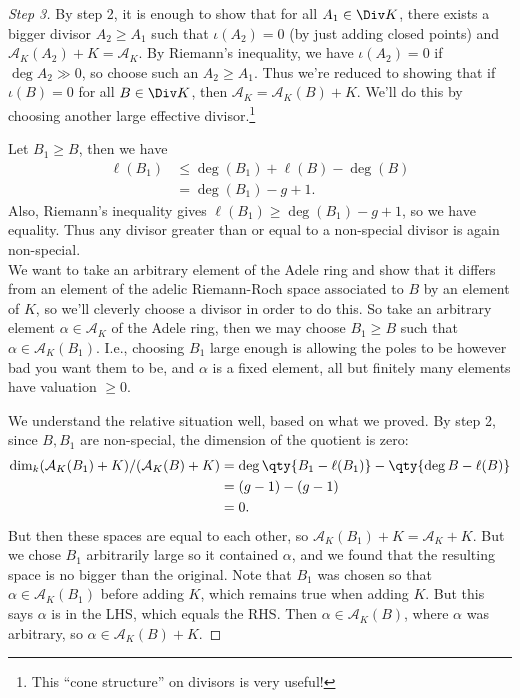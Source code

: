 \begin{proof}[Step 3]

By step 2, it is enough to show that for all \(A_1 \in \Div K\), there
exists a bigger divisor \(A_2 \geq A_1\) such that \(\iota(A_2) = 0\)
(by just adding closed points) and
\(\mathcal{A}_K(A_2) + K = \mathcal{A}_K\). By Riemann's inequality, we
have \(\iota(A_2) =0\) if \(\deg A_2 \gg 0\), so choose such an
\(A_2 \geq A_1\). Thus we're reduced to showing that if \(\iota(B) = 0\)
for all \(B\in \Div K\), then \(\mathcal{A}_K = \mathcal{A}_K(B) + K\).
We'll do this by choosing another large effective divisor.\footnote{This
  ``cone structure'' on divisors is very useful!}

Let \(B_1 \geq B\), then we have
\begin{align*}  
\ell(B_1) 
&\leq \deg(B_1) + \ell(B) - \deg(B) \\
&= \deg(B_1) - g + 1
.\end{align*} Also, Riemann's inequality gives
\(\ell(B_1) \geq \deg(B_1) - g + 1\), so we have equality. Thus any
divisor greater than or equal to a non-special divisor is again
non-special.\\

We want to take an arbitrary element of the Adele ring and show that it
differs from an element of the adelic Riemann-Roch space associated to
\(B\) by an element of \(K\), so we'll cleverly choose a divisor in
order to do this. So take an arbitrary element
\(\alpha\in \mathcal{A}_K\) of the Adele ring, then we may choose
\(B_1 \geq B\) such that \(\alpha\in \mathcal{A}_K(B_1)\). I.e.,
choosing \(B_1\) large enough is allowing the poles to be however bad
you want them to be, and \(\alpha\) is a fixed element, all but finitely
many elements have valuation \(\geq 0\).

We understand the relative situation well, based on what we proved. By
step 2, since \(B, B_1\) are non-special, the dimension of the quotient
is zero:
\begin{align*}  
\dim_k(\mathcal{A}_K(B_1) + K) / (\mathcal{A}_K(B) + K) 
&= \deg \qty{B_1 - \ell(B_1)} - \qty{\deg B - \ell(B) } \\
&= (g-1) - (g-1) \\
&= 0
.\end{align*} But then these spaces are equal to each other, so
\(\mathcal{A}_K(B_1) + K = \mathcal{A}_K + K\). But we chose \(B_1\)
arbitrarily large so it contained \(\alpha\), and we found that the
resulting space is no bigger than the original. Note that \(B_1\) was
chosen so that \(\alpha\in \mathcal{A}_K(B_1)\) before adding \(K\),
which remains true when adding \(K\). But this says \(\alpha\) is in the
LHS, which equals the RHS. Then \(\alpha \in \mathcal{A}_K(B)\), where
\(\alpha\) was arbitrary, so \(\alpha\in \mathcal{A}_K(B) + K\).

\end{proof}

